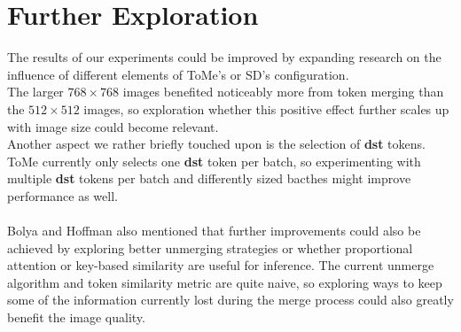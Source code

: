 \section{Further Exploration}
The results of our experiments could be improved by expanding research on the influence of different elements of ToMe's or SD's configuration.\\ 
The larger $768 \times 768$ images benefited noticeably more from token merging than the $512 \times 512$ images, so exploration whether this positive effect further scales up with image size could become relevant.\\
Another aspect we rather briefly touched upon is the selection of \textbf{dst} tokens. ToMe currently only selects one \textbf{dst} token per batch, so experimenting with multiple \textbf{dst} tokens per batch and differently sized bacthes might improve performance as well.\\ 
\\
Bolya and Hoffman also mentioned that further improvements could also be achieved by exploring better unmerging strategies or whether proportional attention or key-based similarity are useful for inference.
The current unmerge algorithm and token similarity metric are quite naive, so exploring ways to keep some of the information currently lost during the merge process could also greatly benefit the image quality.



